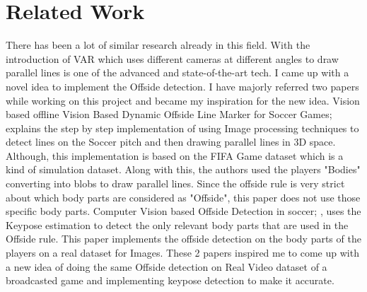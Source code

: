\section{Related Work}
There has been a lot of similar research already in this field. With the introduction of VAR which uses different cameras at different angles to draw parallel lines is one of the advanced and state-of-the-art tech. I came up with a novel idea to implement the Offside detection. I have majorly referred two papers while working on this project and became my inspiration for the new idea. Vision based offline Vision Based Dynamic Offside Line Marker for Soccer Games; \cite{muthuraman2018vision} explains the step by step implementation of using Image processing techniques to detect lines on the Soccer pitch and then drawing parallel lines in 3D space. Although, this implementation is based on the FIFA Game dataset which is a kind of simulation dataset. Along with this, the authors used the players "Bodies" converting into blobs to draw parallel lines. Since the offside rule is very strict about which body parts are considered as "Offside", this paper does not use those specific body parts. Computer Vision based Offside Detection in soccer; \cite{10.1145/3422844.3423055}, uses the Keypose estimation to detect the only relevant body parts that are used in the Offside rule. This paper implements the offside detection on the body parts of the players on a real dataset for Images. These 2 papers inspired me to come up with a new idea of doing the same Offside detection on Real Video dataset of a broadcasted game and implementing keypose detection to make it accurate.
